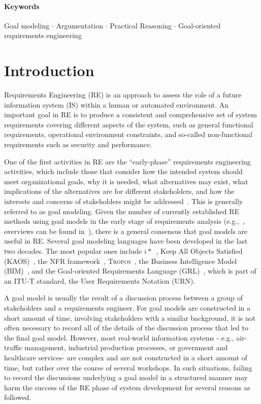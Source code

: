 \documentclass[11.5pt,two column]{llncs}
\begin{document}
\newpage

\paragraph{Keywords} Goal modeling $\cdot$ Argumentation $\cdot$ Practical Reasoning $\cdot$ Goal-oriented requirements engineering

\section{Introduction}
\label{sect:introduction}
Requirements Engineering (RE) is an approach to assess the role of a future information system (IS) within a human or automated environment. An important goal in RE is to produce a consistent and comprehensive set of system requirements covering different aspects of the system, such as general functional requirements, operational environment constraints, and so-called non-functional requirements such as security and performance. 

One of the first activities in RE are the ``early-phase'' requirements engineering activities, which include those that consider how the intended system should meet organizational goals, why it is needed, what alternatives may exist, what implications of the alternatives are for different stakeholders, and how the interests and concerns of stakeholders might be addressed~\cite{yu1997towards}. This is generally referred to as goal modeling. Given the number of currently established RE methods using goal models in the early stage of requirements analysis (e.g.,~\cite{liu2004designing,donzelli2004goal,dardenne1993goal,chung2012non,castro2002towards}, overviews can be found in~\cite{van2001goal,kavakliL05}), there is a general consensus that goal models are useful in RE. Several goal modeling languages have been developed in the last two decades. The most popular ones include $i*$~\cite{Yu:1997:TMR:827255.827807}, Keep All Objects Satisfied (KAOS)~\cite{van2008requirements}, the NFR framework~\cite{chung2012non}, \textsc{Tropos}~\cite{giorgini2005goal}, the Business Intelligence Model (BIM)~\cite{horkoff2014strategic}, and the Goal-oriented Requirements Language (GRL)~\cite{URN}, which is part of an ITU-T standard, the User Requirements Notation (URN).

A goal model is usually the result of a discussion process between a group of stakeholders and a requirements engineer. For goal models are constructed in a short amount of time, involving stakeholders with a similar background, it is not often necessary to record all of the details of the discussion process that led to the final goal model. %
However, most real-world information systems \-- e.g., air-traffic management, industrial production processes, or government and healthcare services\-- are complex and are not constructed in a short amount of time, but rather over the course of several workshops. In such situations, failing to record the discussions underlying a goal model in a structured manner may harm the success of the RE phase of system development for several reasons as followed. 
\end{document}
